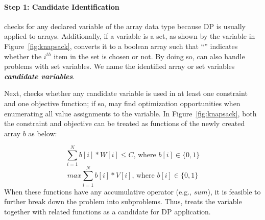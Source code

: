 \paragraph*{Step 1: Candidate Identification}
\tool checks for any declared variable of the array data type because DP is usually applied to arrays. Additionally, if a variable is a set, as shown by the  variable in Figure~\ref{fig:knapsack}, \tool converts it to a boolean array  such that ``'' indicates whether the $i^{th}$ item in the set is chosen or not. 
By doing so, \tool can also handle problems with set variables. We name the identified array or set variables \textbf{\emph{candidate variables}}. 
 
Next, \tool checks 
whether any candidate variable is used in at least one constraint and one objective function; if so, \tool may find optimization opportunities when enumerating all value assignments to the variable. 
In Figure~\ref{fig:knapsack}, both the constraint and objective can be treated as functions of the newly created array $b$ as below: 


\begin{equation}
\label{eq1}
   \sum_{i=1}^{N}b[i]*W[i] \le C \text{, where }b[i]\in\{0, 1\}  \tag{3.1}
\end{equation}
\begin{equation}
\label{eq2}
    max \sum_{i=1}^{N}b[i]*V[i] \text{, where }b[i]\in\{0, 1\}  \tag{3.2}
\end{equation}
When these functions have any accumulative operator (e.g., $sum$), it is feasible to further break down the problem into subproblems.
Thus, \tool treats the variable  together with related functions as a candidate for DP application.

